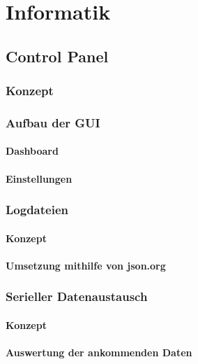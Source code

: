 
\chapter{Informatik}
\section{Control Panel}
\label{sec:controlpanel}

\subsection{Konzept}


\subsection{Aufbau der GUI}

\subsubsection{Dashboard}

\subsubsection{Einstellungen}

\subsection{Logdateien}

\subsubsection{Konzept}
\subsubsection{Umsetzung mithilfe von json.org}

\subsection{Serieller Datenaustausch}
\subsubsection{Konzept}
\subsubsection{Auswertung der ankommenden Daten}
